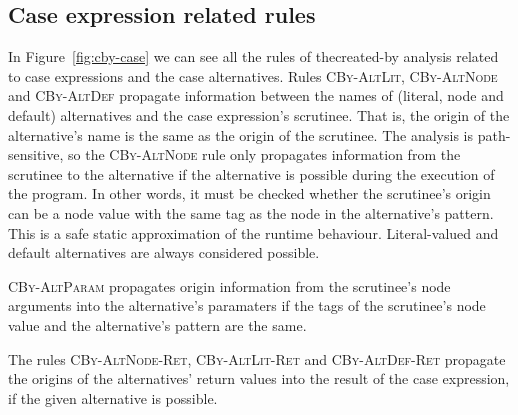 \documentclass[main.tex]{subfiles}
\begin{document}
	\subsection{Case expression related rules} \label{subsec:cby-case}
	
	In Figure~\ref{fig:cby-case} we can see all the rules of thecreated-by analysis related to case expressions and the case alternatives. Rules \textsc{CBy-AltLit}, \textsc{CBy-AltNode} and \textsc{CBy-AltDef} propagate information between the names of (literal, node and default) alternatives and the case expression's scrutinee. That is, the origin of the alternative's name is the same as the origin of the scrutinee. The analysis is path-sensitive, so the \textsc{CBy-AltNode} rule only propagates information from the scrutinee to the alternative if the alternative is possible during the execution of the program. In other words, it must be checked whether the scrutinee's origin can be a node value with the same tag as the node in the alternative's pattern. This is a safe static approximation of the runtime behaviour. Literal-valued and default alternatives are always considered possible.
	
	\textsc{CBy-AltParam} propagates origin information from the scrutinee's node arguments into the alternative's paramaters if the tags of the scrutinee's node value and the alternative's pattern are the same.
	
	The rules \textsc{CBy-AltNode-Ret}, \textsc{CBy-AltLit-Ret} and \textsc{CBy-AltDef-Ret} propagate the origins of the alternatives' return values into the result of the case expression, if the given alternative is possible.
\end{document}
